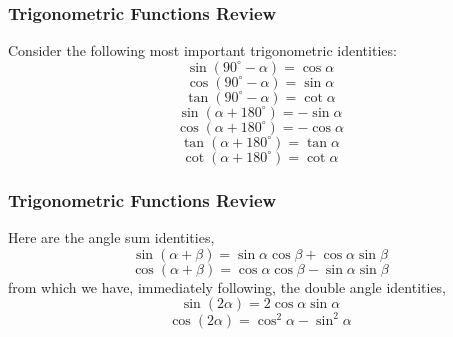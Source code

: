 \documentclass[xcolor=dvipsnames]{beamer}
\begin{document}
\begin{frame}
  \frametitle{Trigonometric Functions Review}
  Consider the following most important trigonometric identities:
\begin{equation}
  \label{eq:dieteipa}
  \sin(90^{\circ}-\alpha)=\cos\alpha
\end{equation}
\begin{equation}
  \label{eq:oepoodoh}
  \cos(90^{\circ}-\alpha)=\sin\alpha
\end{equation}
\begin{equation}
  \label{eq:aiwatong}
  \tan(90^{\circ}-\alpha)=\cot\alpha
\end{equation}
\begin{equation}
  \label{eq:jahpeexu}
  \sin(\alpha+180^{\circ})=-\sin\alpha
\end{equation}
\begin{equation}
  \label{eq:aephuemo}
  \cos(\alpha+180^{\circ})=-\cos\alpha
\end{equation}
\begin{equation}
  \label{eq:xaiyahcu}
  \tan(\alpha+180^{\circ})=\tan\alpha
\end{equation}
\begin{equation}
  \label{eq:aitahwae}
  \cot(\alpha+180^{\circ})=\cot\alpha
\end{equation}
\end{frame}

\begin{frame}
  \frametitle{Trigonometric Functions Review}
  Here are the angle sum identities,
  \begin{equation}
  \label{eq:eitaiquu}
  \sin(\alpha+\beta)=\sin\alpha\cos\beta+\cos\alpha\sin\beta
\end{equation}
\begin{equation}
  \label{eq:iasoojou}
  \cos(\alpha+\beta)=\cos\alpha\cos\beta-\sin\alpha\sin\beta
\end{equation}
from which we have, immediately following, the double angle
identities,
  \begin{equation}
    \label{eq:icuchodo}
    \sin(2\alpha)=2\cos\alpha\sin\alpha
  \end{equation}
  \begin{equation}
    \label{eq:woojahtu}
    \cos(2\alpha)=\cos^{2}\alpha-\sin^{2}\alpha
  \end{equation}
\end{frame}
\end{document}
